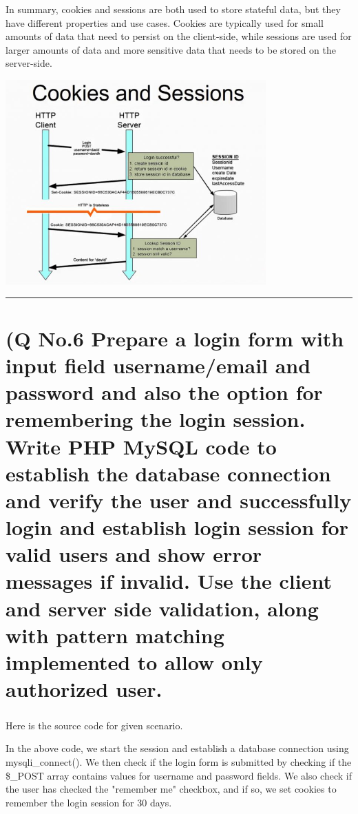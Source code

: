 \documentclass[11pt]{article}
\begin{document}
In summary, cookies and sessions are both used to store stateful data, but they have different properties and use cases. Cookies are typically used for small amounts of data that need to persist on the client-side, while sessions are used for larger amounts of data and more sensitive data that needs to be stored on the server-side.

\includegraphics[width=0.75\textwidth]{resources/session_cookie.jpg}


\noindent\rule{\linewidth}{0.4pt}
\section{(Q No.6 Prepare a login form with input field username/email and password and also the option for remembering the login session. Write PHP MySQL code to establish the database connection and verify the user and successfully login and establish login session for valid users and show error messages if invalid. Use the client and server side validation, along with pattern matching implemented to allow only authorized user.}
\subparagraph{}

Here is the source code for given scenario.






In the above code, we start the session and establish a database connection using mysqli\_connect(). We then check if the login form is submitted by checking if the \$\_POST array contains values for username and password fields. We also check if the user has checked the "remember me" checkbox, and if so, we set cookies to remember the login session for 30 days.
\end{document}
